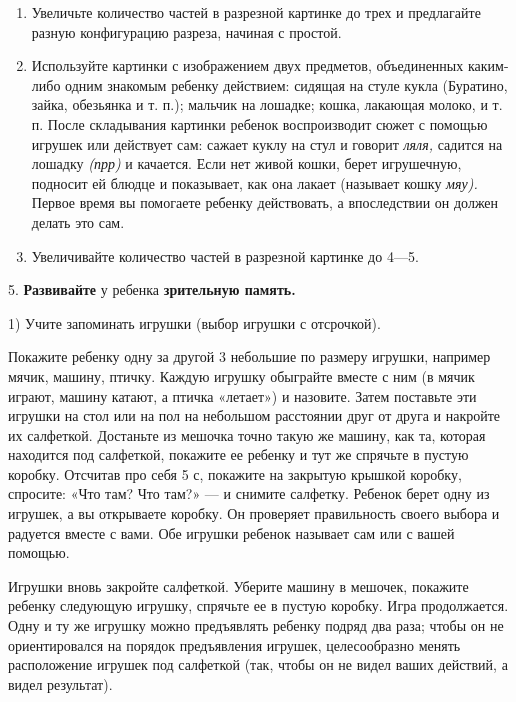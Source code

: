\documentclass{book}
\renewcommand{\emph}[1]{\textit{#1}}
\begin{document}
\begin{enumerate}
\def\labelenumi{\arabic{enumi})}
\setcounter{enumi}{3}
\item
  
  Увеличьте количество частей в разрезной картинке до трех и предлагайте
  разную конфигурацию разреза, начиная с простой.
  
\item
  
  Используйте картинки с изображением двух предметов, объединенных
  каким-либо одним знакомым ребенку действием: сидящая на стуле кукла
  (Буратино, зайка, обезьянка и т. п.); мальчик на лошадке; кошка,
  лакающая молоко, и т. п. После складывания картинки ребенок
  воспроизводит сюжет с помощью игрушек или действует сам: сажает куклу
  на стул и говорит \emph{ляля,} садится на лошадку \emph{(прр)} и
  качается. Если нет живой кошки, берет игрушечную, подносит ей блюдце и
  показывает, как она лакает (называет кошку \emph{мяу).} Первое время
  вы помогаете ребенку действовать, а впоследствии он должен делать это
  сам.
  
\item
  
  Увеличивайте количество частей в разрезной картинке до 4---5.
  
\end{enumerate}


5. \textbf{Развивайте} у ребенка \textbf{зрительную память.}

1) Учите запоминать игрушки (выбор игрушки с отсрочкой).

Покажите ребенку одну за другой 3 небольшие по размеру игрушки, например
мячик, машину, птичку. Каждую игрушку обыграйте вместе с ним (в мячик
играют, машину катают, а птичка «летает») и назовите. Затем поставьте
эти игрушки на стол или на пол на небольшом расстоянии друг от друга и
накройте их салфеткой. Достаньте из мешочка точно такую же машину, как
та, которая находится под салфеткой, покажите ее ребенку и тут же
спрячьте в пустую коробку. Отсчитав про себя 5 с, покажите на закрытую
крышкой коробку, спросите: «Что там? Что там?» --- и снимите салфетку.
Ребенок берет одну из игрушек, а вы открываете коробку. Он проверяет
правильность своего выбора и радуется вместе с вами. Обе игрушки ребенок
называет сам или с вашей помощью.

Игрушки вновь закройте салфеткой. Уберите машину в мешочек, покажите
ребенку следующую игрушку, спрячьте ее в пустую коробку. Игра
продолжается. Одну и ту же игрушку можно предъявлять ребенку подряд два
раза; чтобы он не ориентировался на порядок предъявления игрушек,
целесообразно менять расположение игрушек под салфеткой (так, чтобы он
не видел ваших действий, а видел результат).
\end{document}
